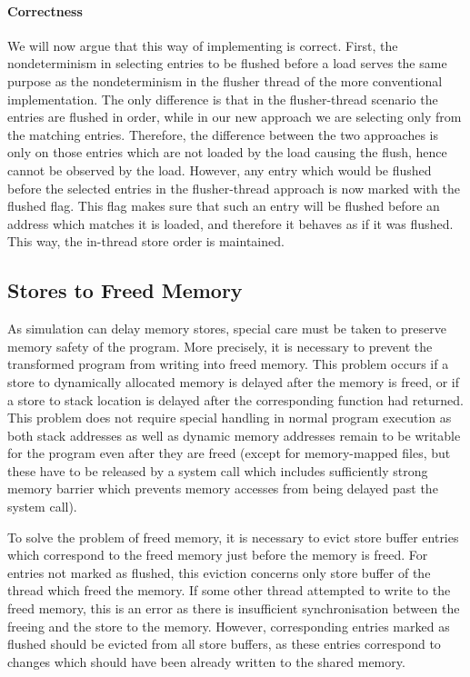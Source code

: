\paragraph{Correctness}%
%
We will now argue that this way of implementing \xtso is correct.
First, the nondeterminism in selecting entries to be flushed before a load serves the same purpose as the nondeterminism in the flusher thread of the more conventional implementation.
The only difference is that in the flusher-thread scenario the entries are
flushed in order, while in our new approach we are selecting only from the matching entries.
Therefore, the difference between the two approaches is only on those entries
which are not loaded by the load causing the flush, hence cannot be observed by the load.
However, any entry which would be flushed before the selected entries in the flusher-thread approach is now marked with the flushed flag.
This flag makes sure that such an entry will be flushed before an address which matches it is loaded, and therefore it behaves as if it was flushed.
This way, the in-thread store order is maintained.


\subsection{Stores to Freed Memory}

As \xtso simulation can delay memory stores, special care must be taken to preserve memory safety of the program.
More precisely, it is necessary to prevent the transformed program from writing into freed memory.
This problem occurs if a store to dynamically allocated memory is delayed after the memory is freed, or if a store to stack location is delayed after the corresponding function had returned.
This problem does not require special handling in normal program execution as both stack addresses as well as dynamic memory addresses remain to be writable for the program even after they are freed (except for memory-mapped files, but these have to be released by a system call which includes sufficiently strong memory barrier which prevents memory accesses from being delayed past the system call).

To solve the problem of freed memory, it is necessary to evict store buffer entries which correspond to the freed memory just before the memory is freed.
For entries not marked as flushed, this eviction concerns only store buffer of the thread which freed the memory.
If some other thread attempted to write to the freed memory, this is an error as there is insufficient synchronisation between the freeing and the store to the memory.
However, corresponding entries marked as flushed should be evicted from all store buffers, as these entries correspond to changes which should have been already written to the shared memory.

